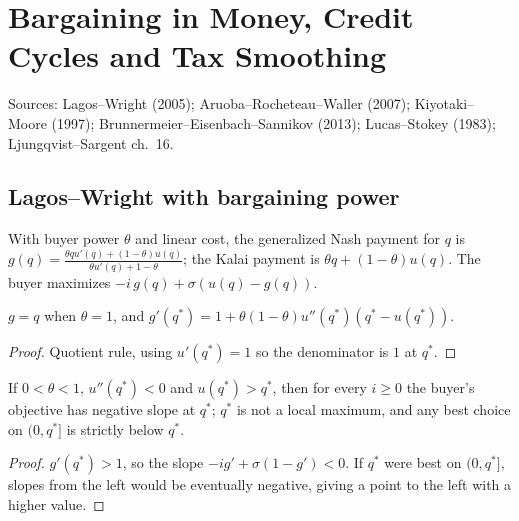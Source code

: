 \chapter{Bargaining in Money, Credit Cycles and Tax Smoothing}
\label{chap:money_credit_fiscal}

Sources: Lagos--Wright (2005); Aruoba--Rocheteau--Waller (2007); Kiyotaki--Moore (1997);
Brunnermeier--Eisenbach--Sannikov (2013); Lucas--Stokey (1983); Ljungqvist--Sargent ch.~16.

\section{Lagos--Wright with bargaining power}

\begin{definition}
\label{def:lw_bargain}
\leanok
With buyer power $\theta$ and linear cost, the generalized Nash payment for $q$ is
$g(q)=\frac{\theta q u'(q)+(1-\theta)u(q)}{\theta u'(q)+1-\theta}$; the Kalai payment is $\theta q+(1-\theta)u(q)$.
The buyer maximizes $-i\,g(q)+\sigma(u(q)-g(q))$.
\end{definition}

\begin{lemma}
\label{lem:lw_nashpay}
\leanok
{}
$g=q$ when $\theta=1$, and $g'(q^*)=1+\theta(1-\theta)u''(q^*)(q^*-u(q^*))$.
\end{lemma}
\begin{proof}
\leanok
Quotient rule, using $u'(q^*)=1$ so the denominator is $1$ at $q^*$.
\end{proof}

\begin{theorem}
\label{thm:lw_holdup}
\leanok
{}
If $0<\theta<1$, $u''(q^*)<0$ and $u(q^*)>q^*$, then for every $i\ge0$ the buyer's objective has negative slope at
$q^*$; $q^*$ is not a local maximum, and any best choice on $(0,q^*]$ is strictly below $q^*$.
\end{theorem}
\begin{proof}
\leanok
$g'(q^*)>1$, so the slope $-ig'+\sigma(1-g')<0$. If $q^*$ were best on $(0,q^*]$, slopes from the left would be
eventually negative, giving a point to the left with a higher value.
\end{proof}

